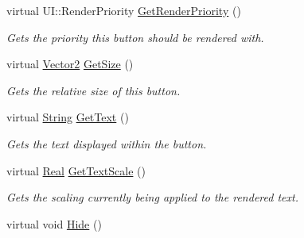 \begin{DoxyCompactItemize}
virtual UI::RenderPriority \hyperlink{classphys_1_1UI_1_1TextButton_ad339621af6e73ff9702c0dd4cdadbb73}{GetRenderPriority} ()
\begin{DoxyCompactList}\small\item\em Gets the priority this button should be rendered with. \item\end{DoxyCompactList}\item 
virtual \hyperlink{classphys_1_1Vector2}{Vector2} \hyperlink{classphys_1_1UI_1_1TextButton_a21f1ff24070711e5a42eae4eb54d02d6}{GetSize} ()
\begin{DoxyCompactList}\small\item\em Gets the relative size of this button. \item\end{DoxyCompactList}\item 
virtual \hyperlink{namespacephys_aa03900411993de7fbfec4789bc1d392e}{String} \hyperlink{classphys_1_1UI_1_1TextButton_a8dc28f2fa610dc9bb72e5886613996bd}{GetText} ()
\begin{DoxyCompactList}\small\item\em Gets the text displayed within the button. \item\end{DoxyCompactList}\item 
virtual \hyperlink{namespacephys_af7eb897198d265b8e868f45240230d5f}{Real} \hyperlink{classphys_1_1UI_1_1TextButton_a5cc3750a8565b91d4b4bc91e953f8401}{GetTextScale} ()
\begin{DoxyCompactList}\small\item\em Gets the scaling currently being applied to the rendered text. \item\end{DoxyCompactList}\item 
\hypertarget{classphys_1_1UI_1_1TextButton_aef823890ba8c829183f1b618473c1bac}{
virtual void \hyperlink{classphys_1_1UI_1_1TextButton_aef823890ba8c829183f1b618473c1bac}{Hide} ()}
\label{classphys_1_1UI_1_1TextButton_aef823890ba8c829183f1b618473c1bac}


\end{DoxyCompactItemize}
